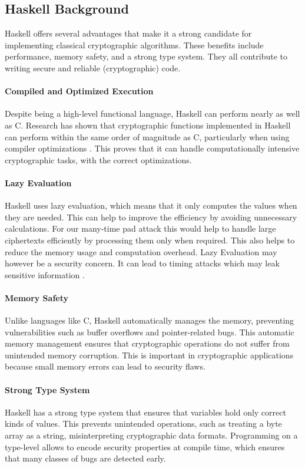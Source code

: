 \subsection{Haskell Background}
\label{sec:why_haskell}
Haskell offers several advantages that make it a strong candidate for implementing classical cryptographic algorithms. 
These benefits include performance, memory safety, and a strong type system. 
They all contribute to writing secure and reliable (cryptographic) code. 

\paragraph{Compiled and Optimized Execution} 
Despite being a high-level functional language, Haskell can perform nearly as well as C. 
Research has shown that cryptographic functions implemented in Haskell can perform within the same order of magnitude as C, 
particularly when using compiler optimizations \cite{tevis2006secure}. 
This proves that it can handle computationally intensive cryptographic tasks, with the correct optimizations.

\paragraph{Lazy Evaluation} 
Haskell uses lazy evaluation, which means that it only computes the values when they are needed. 
This can help to improve the efficiency by avoiding unnecessary calculations. 
For our many-time pad attack this would help to handle large ciphertexts efficiently by processing them only when required. 
This also helps to reduce the memory usage and computation overhead.
Lazy Evaluation may however be a security concern. It can lead to timing attacks which may leak sensitive information \cite{lazy2013}.

\paragraph{Memory Safety}
Unlike languages like C, Haskell automatically manages the memory, preventing vulnerabilities such as buffer overflows and pointer-related bugs. 
This automatic memory management ensures that cryptographic operations do not suffer from unintended memory corruption. 
This is important in cryptographic applications because small memory errors can lead to security flaws. 

\paragraph{Strong Type System}
Haskell has a strong type system that ensures that variables hold only correct kinds of values. 
This prevents unintended operations, such as treating a byte array as a string, misinterpreting cryptographic data formats. 
Programming on a type-level allows to encode security properties at compile time, which ensures that many classes of bugs are detected early.

